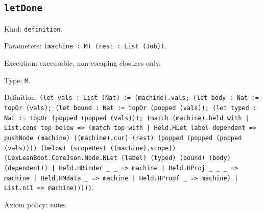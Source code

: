 \documentclass[11pt]{article}
\begin{document}
\subsection*{\texttt{letDone}}
\noindent Kind: \texttt{definition}.\par
\noindent Parameters: \texttt{(machine : M) (rest : List (Job))}.\par
\noindent Execution: executable, non-escaping closures only.\par
\noindent Type: \texttt{M}.\par
\noindent Definition: \texttt{(let vals : List (Nat) := (machine).vals; (let body : Nat := topOr (vals); (let bound : Nat := topOr (popped (vals)); (let typed : Nat := topOr (popped (popped (vals))); (match (machine).held with | List.cons top below => (match top with | Held.HLet label dependent => pushNode (machine) ((machine).cur) (rest) (popped (popped (popped (vals)))) (below) (scopeRest ((machine).scope)) (LexLeanBoot.CoreJson.Node.NLet (label) (typed) (bound) (body) (dependent)) | Held.HBinder \_ \_ => machine | Held.HProj \_ \_ \_ => machine | Held.HMdata \_ => machine | Held.HProof \_ => machine) | List.nil => machine)))))}.\par
\noindent Axiom policy: \texttt{none}.\par
\end{document}
